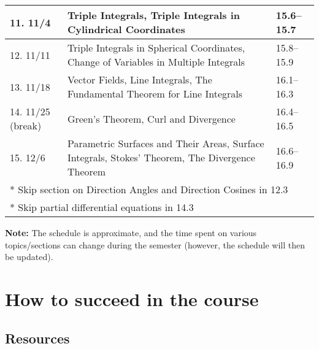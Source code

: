\documentclass[oneside,11pt]{amsart}
\begin{document}
\begin{center}
\begin{longtable}{|l|p{}|l|}
    \hline
    11. 11/4 & Triple Integrals, Triple Integrals in Cylindrical Coordinates & 15.6--15.7 \\
    \hline
    12. 11/11 & Triple Integrals in Spherical Coordinates, Change of Variables in Multiple Integrals & 15.8--15.9 \\
    \hline
    13. 11/18 & Vector Fields, Line Integrals, The Fundamental Theorem for Line Integrals & 16.1--16.3 \\
    \hline
    14. 11/25
		(break) & Green's Theorem, Curl and Divergence & 16.4--16.5 \\
    \hline
		15. 12/6 & 
		Parametric Surfaces and Their Areas, Surface Integrals,
		Stokes' Theorem, The Divergence Theorem
		& 16.6--16.9 \\
		\hline
    \multicolumn{3}{l}{* Skip section on Direction Angles and Direction Cosines in 12.3}\\
	\multicolumn{3}{l}{* Skip partial differential equations in 14.3} \\
\end{longtable}
\end{center}

\vspace{5pt}

\textbf{Note:} The schedule is approximate, and the time spent on various topics/sections can change during the semester (however, the schedule will then be updated).

\section{How to succeed in the course}

\subsection{Resources}
\end{document}

